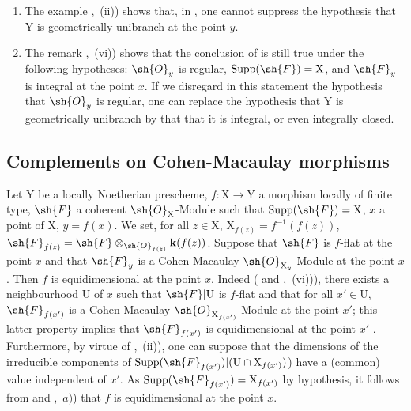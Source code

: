 \begin{remarks}[15.3.4]
\label{IV.15.3.4}
\begin{enumerate}[label=(\roman*)]
  \item The example ,~(ii)) shows that, in , one cannot suppress the hypothesis that $\mathrm{Y}$ is geometrically unibranch at the point $y$.
  \item The remark ,~(vi)) shows that the conclusion of  is still true under the following hypotheses: $\sh{O}_y$ is regular, $\operatorname{Supp}(\sh{F})=\mathrm{X}$, and $\sh{F}_y$ is integral at the point $x$.
If we disregard in this statement the hypothesis that $\sh{O}_y$ is regular, one can replace the hypothesis that $\mathrm{Y}$ is geometrically unibranch by that that it is integral, or even integrally closed.
\end{enumerate}
\end{remarks}

\subsection{Complements on Cohen-Macaulay morphisms}
\label{subsection:IV.15.4}

\begin{proposition}[15.4.1]
\label{IV.15.4.1}
Let $\mathrm{Y}$ be a locally Noetherian prescheme, $f:\mathrm{X}\to\mathrm{Y}$ a morphism locally of finite type, $\sh{F}$ a coherent $\sh{O}_\mathrm{X}$-Module such that $\operatorname{Supp}(\sh{F})=\mathrm{X}$, $x$ a point of $\mathrm{X}$, $y=f(x)$.
We set, for all $z\in\mathrm{X}$, $\mathrm{X}_{f(z)}=f^{-1}(f(z))$, $\sh{F}_{f(z)}=\sh{F}\otimes_{\sh{O}_{f(z)}}\mathbf{k}(f(z))$.
Suppose that $\sh{F}$ is $f$-flat at the point $x$ and that $\sh{F}_y$ is a Cohen-Macaulay $\sh{O}_{\mathrm{X}_y}$-Module at the point $x$.
Then $f$ is
equidimensional at the point $x$.
Indeed ( and ,~(vi))), there exists a neighbourhood $\mathrm{U}$ of $x$ such that $\sh{F}|\mathrm{U}$ is $f$-flat and that for all $x'\in\mathrm{U}$, $\sh{F}_{f(x')}$ is a Cohen-Macaulay $\sh{O}_{\mathrm{X}_{f(x')}}$-Module at the point $x'$; this latter property implies that $\sh{F}_{f(x')}$ is equidimensional at the point $x'$ .
Furthermore, by virtue of ,~(ii)), one can suppose that the dimensions of the irreducible components of $\operatorname{Supp}(\sh{F}_{f(x')})|(\mathrm{U}\cap\mathrm{X}_{f(x')})$) have a (common) value independent of $x'$.
As $\operatorname{Supp}(\sh{F}_{f(x')})=\mathrm{X}_{f(x')}$ by hypothesis, it follows from  and ,~$a)$) that $f$ is equidimensional at the point $x$.
\end{proposition}

